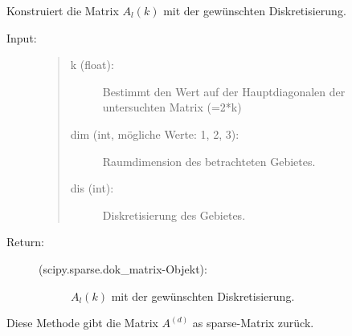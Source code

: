 \documentclass[a4paper,10pt,ngerman, oneside,openright]{sphinxmanual}
\begin{document}
\begin{fulllineitems}
\begin{fulllineitems}
\begin{description}
\begin{description}
\end{description}

\end{description}

\end{fulllineitems}


\begin{fulllineitems}
\label{\detokenize{index:sparse.Sparse.constr_mat_l_k}}
Konstruiert die Matrix $A_l(k)$ mit der gewünschten Diskretisierung.

\begin{description}
\item[{Input:}]\leavevmode
\begin{quote}
\begin{description}
\item[{k (float):}] \leavevmode
Bestimmt den Wert auf der Hauptdiagonalen der untersuchten Matrix (=2*k)

\item[{dim (int, mögliche Werte: 1, 2, 3):}] \leavevmode
Raumdimension des betrachteten Gebietes.

\item[{dis (int):}] \leavevmode
Diskretisierung des Gebietes.
\end{description}

\end{quote}
\end{description}
\begin{description}
\item[{Return:}] \leavevmode\begin{description}
\item[{(scipy.sparse.dok\_matrix-Objekt):}] \leavevmode
$A_l(k)$ mit der gewünschten Diskretisierung.

\end{description}

\end{description}

\end{fulllineitems}


\begin{fulllineitems}
\label{\detokenize{index:sparse.Sparse.return_mat_d}}
Diese Methode gibt die Matrix $A^{(d)}$ as sparse-Matrix zurück.



\end{fulllineitems}
\end{fulllineitems}
\end{document}
